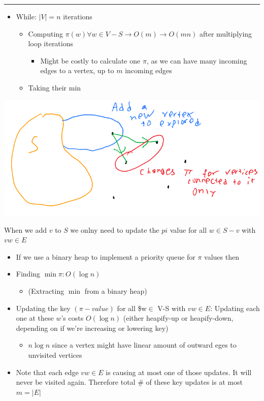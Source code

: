 \documentclass[11pt]{article}
\begin{document}
\noindent\rule{\textwidth}{0.5pt}
\begin{itemize}
\item While: \(|V| = n\) iterations
\begin{itemize}
\item Computing \(\pi(w) \forall w \in V - S \rightarrow O(m) \rightarrow O(mn)\) after multiplying loop iterations
\begin{itemize}
\item Might be costly to calculate one \(\pi\), as we can have many incoming edges to a vertex, up to \(m\) incoming edges
\end{itemize}
\item Taking their min
\end{itemize}
\end{itemize}
\begin{center}
\includegraphics[width=.9\linewidth]{./Images/i41.png}
\end{center}
When we add \(v\) to \(S\) we onlny need to update the \(pi\) value for all \(w \in S-v\) with \(vw \in E\)
\begin{itemize}
\item If we use a binary heap to implement a priority queue for \(\pi\) values then
\item Finding \(\min \pi : O(\log n)\)
\begin{itemize}
\item (Extracting \(\min\) from a binary heap)
\end{itemize}
\item Updating the key \((\pi-value)\) for all \$w\(\in\) V-S with \(vw \in E\): Updating each one at these \(w\)'s costs \(O(\log n)\) (either heapify-up or heapify-down, depending on if we're increasing or lowering key)
\begin{itemize}
\item \(n \log n\) since a vertex might have linear amount of outward eges to unvisited vertices
\end{itemize}
\item Note that each edge \(vw \in E\) is causing at most one of those updates. It will never be visited again. Therefore total \# of these key updates is at most \(m=|E|\)
\end{itemize}
\end{document}
